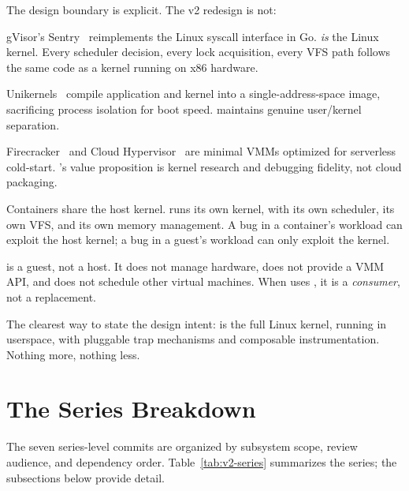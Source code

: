 The design boundary is explicit.  The v2 redesign is not:

\begin{description}[style=nextline,leftmargin=2em]
  \item[A kernel reimplementation (gVisor).]
    gVisor's Sentry~\cite{gvisor} reimplements the Linux syscall
    interface in Go.  \UML{} \emph{is} the Linux kernel.  Every
    scheduler decision, every lock acquisition, every VFS path follows
    the same code as a kernel running on x86 hardware.

  \item[A unikernel (Unikraft, MirageOS).]
    Unikernels~\cite{kuenzer2021,madhavapeddy2013} compile application
    and kernel into a single-address-space image, sacrificing process
    isolation for boot speed.  \UML{} maintains genuine user/kernel
    separation.

  \item[A microVM (Firecracker, Cloud Hypervisor).]
    Firecracker~\cite{agache2020} and Cloud Hypervisor~\cite{cloud-hypervisor}
    are minimal VMMs optimized for serverless cold-start.  \UML{}'s
    value proposition is kernel research and debugging fidelity, not
    cloud packaging.

  \item[A container runtime.]
    Containers share the host kernel.  \UML{} runs its own kernel,
    with its own scheduler, its own VFS, and its own memory management.
    A bug in a container's workload can exploit the host kernel; a bug
    in a \UML{} guest's workload can only exploit the \UML{} kernel.

  \item[A hypervisor.]
    \UML{} is a guest, not a host.  It does not manage hardware, does
    not provide a VMM API, and does not schedule other virtual machines.
    When \UML{} uses \KVM{}, it is a \KVM{} \emph{consumer}, not a
    \KVM{} replacement.
\end{description}

\noindent
The clearest way to state the design intent: \UML{} is the full Linux
kernel, running in userspace, with pluggable trap mechanisms and
composable instrumentation.  Nothing more, nothing less.


\section{The Series Breakdown}
\label{sec:v2-series}

The seven series-level commits are organized by subsystem scope,
review audience, and dependency order.  Table~\ref{tab:v2-series}
summarizes the series; the subsections below provide detail.

